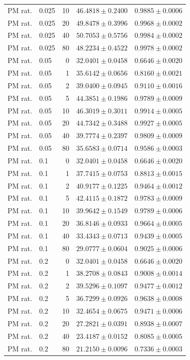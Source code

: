 \begin{longtable}{llrll}
PM rat. & 0.025 & 10 & $46.4818 \pm 0.2400$ & $0.9885 \pm 0.0006$ \\
PM rat. & 0.025 & 20 & $49.8478 \pm 0.3996$ & $0.9968 \pm 0.0002$ \\
PM rat. & 0.025 & 40 & $50.7053 \pm 0.5756$ & $0.9984 \pm 0.0002$ \\
PM rat. & 0.025 & 80 & $48.2234 \pm 0.4522$ & $0.9978 \pm 0.0002$ \\
PM rat. & 0.05 & 0 & $32.0401 \pm 0.0458$ & $0.6646 \pm 0.0020$ \\
PM rat. & 0.05 & 1 & $35.6142 \pm 0.0656$ & $0.8160 \pm 0.0021$ \\
PM rat. & 0.05 & 2 & $39.0400 \pm 0.0945$ & $0.9110 \pm 0.0016$ \\
PM rat. & 0.05 & 5 & $44.3851 \pm 0.1986$ & $0.9789 \pm 0.0009$ \\
PM rat. & 0.05 & 10 & $46.3019 \pm 0.3011$ & $0.9914 \pm 0.0005$ \\
PM rat. & 0.05 & 20 & $44.7342 \pm 0.3488$ & $0.9927 \pm 0.0005$ \\
PM rat. & 0.05 & 40 & $39.7774 \pm 0.2397$ & $0.9809 \pm 0.0009$ \\
PM rat. & 0.05 & 80 & $35.6583 \pm 0.0714$ & $0.9586 \pm 0.0003$ \\
PM rat. & 0.1 & 0 & $32.0401 \pm 0.0458$ & $0.6646 \pm 0.0020$ \\
PM rat. & 0.1 & 1 & $37.7415 \pm 0.0753$ & $0.8813 \pm 0.0015$ \\
PM rat. & 0.1 & 2 & $40.9177 \pm 0.1225$ & $0.9464 \pm 0.0012$ \\
PM rat. & 0.1 & 5 & $42.4115 \pm 0.1872$ & $0.9783 \pm 0.0009$ \\
PM rat. & 0.1 & 10 & $39.9642 \pm 0.1549$ & $0.9789 \pm 0.0006$ \\
PM rat. & 0.1 & 20 & $36.8146 \pm 0.0933$ & $0.9664 \pm 0.0005$ \\
PM rat. & 0.1 & 40 & $33.4343 \pm 0.0713$ & $0.9439 \pm 0.0005$ \\
PM rat. & 0.1 & 80 & $29.0777 \pm 0.0604$ & $0.9025 \pm 0.0006$ \\
PM rat. & 0.2 & 0 & $32.0401 \pm 0.0458$ & $0.6646 \pm 0.0020$ \\
PM rat. & 0.2 & 1 & $38.2708 \pm 0.0843$ & $0.9008 \pm 0.0014$ \\
PM rat. & 0.2 & 2 & $39.5296 \pm 0.1097$ & $0.9477 \pm 0.0012$ \\
PM rat. & 0.2 & 5 & $36.7299 \pm 0.0926$ & $0.9638 \pm 0.0008$ \\
PM rat. & 0.2 & 10 & $32.4654 \pm 0.0675$ & $0.9471 \pm 0.0006$ \\
PM rat. & 0.2 & 20 & $27.2821 \pm 0.0391$ & $0.8938 \pm 0.0007$ \\
PM rat. & 0.2 & 40 & $23.4187 \pm 0.0152$ & $0.8085 \pm 0.0005$ \\
PM rat. & 0.2 & 80 & $21.2150 \pm 0.0096$ & $0.7336 \pm 0.0003$ \\
\end{longtable}

